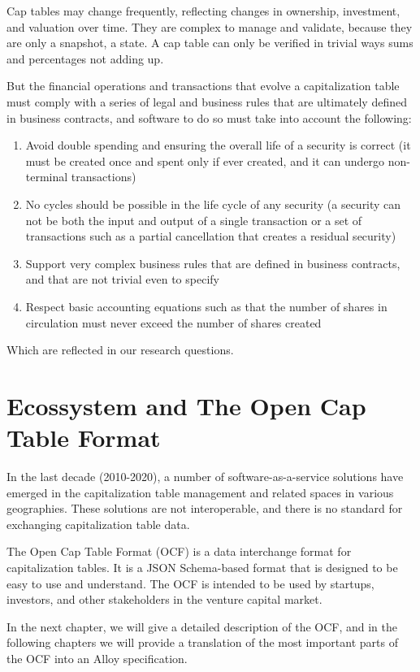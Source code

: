 Cap tables may change frequently, reflecting changes in ownership, investment, and valuation over time. They are complex to manage and validate, because they are only a snapshot, a state. A cap table can only be verified in trivial ways \- sums and percentages not adding up. 

But the financial operations and transactions that evolve a capitalization table must comply with a series of legal and business rules that are ultimately defined in business contracts, and software to do so must take into account the following:

\begin{enumerate}
	\item Avoid double spending and ensuring the overall life of a security is correct (it must be created once and spent only if ever created, and it can undergo non-terminal transactions)
	\item No cycles should be possible in the life cycle of any security (a security can not be both the input and output of a single transaction or a set of transactions such as a partial cancellation that creates a residual security)
	\item Support very complex business rules that are defined in business contracts, and that are not trivial even to specify
	\item Respect basic accounting equations such as that the number of shares in circulation must never exceed the number of shares created
\end{enumerate}

Which are reflected in our research questions.

\section{Ecossystem and The Open Cap Table Format}

In the last decade (2010-2020), a number of software-as-a-service solutions have emerged in the capitalization table management and related spaces in various geographies. These solutions are not interoperable, and there is no standard for exchanging capitalization table data.

The Open Cap Table Format (OCF) is a data interchange format for capitalization tables. It is a JSON Schema-based format that is designed to be easy to use and understand. The OCF is intended to be used by startups, investors, and other stakeholders in the venture capital market.

In the next chapter, we will give a detailed description of the OCF, and in the following chapters we will provide a translation of the most important parts of the OCF into an Alloy specification.

